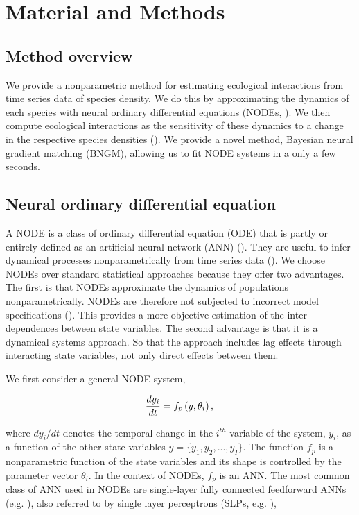 \documentclass[11pt, oneside]{article}
\begin{document}
\section{Material and Methods}

\subsection{Method overview}

We provide a nonparametric method for estimating ecological interactions from time series data of species density. 
We do this by approximating the dynamics of each species with neural ordinary differential equations (NODEs, \cite{Bonnaffe2021a}). 
We then compute ecological interactions as the sensitivity of these dynamics to a change in the respective species densities (\cite{Sugihara2012,Bonnaffe2021a}).
We provide a novel method, Bayesian neural gradient matching (BNGM), allowing us to fit NODE systems in a only a few seconds.

\subsection{Neural ordinary differential equation}

A NODE is a class of ordinary differential equation (ODE) that is partly or entirely defined as an artificial neural network (ANN) (\cite{Chen2018}).
They are useful to infer dynamical processes nonparametrically from time series data (\cite{Bonnaffe2021a}).
We choose NODEs over standard statistical approaches because they offer two advantages. 
The first is that NODEs approximate the dynamics of populations nonparametrically.
NODEs are therefore not subjected to incorrect model specifications (\cite{Jost2000,Adamson2013}).
This provides a more objective estimation of the inter-dependences between state variables. 
The second advantage is that it is a dynamical systems approach. 
So that the approach includes lag effects through interacting state variables, not only direct effects between them. 

We first consider a general NODE system,

\vspace{-0.5cm}
\begin{equation}
    \frac{dy_i}{dt} = f_p \left(y,\theta_i \right), \\
\end{equation}

where $dy_i/dt$ denotes the temporal change in the $i^{th}$ variable of the system, $y_i$, as a function of the other state variables $y = \{ y_1, y_2, ..., y_I\}$.
The function $f_p$ is a nonparametric function of the state variables and its shape is controlled by the parameter vector $\theta_i$.
In the context of NODEs, $f_p$ is an ANN.
The most common class of ANN used in NODEs are single-layer fully connected feedforward ANNs (e.g. \cite{Wu2005}), also referred to by single layer perceptrons (SLPs, e.g. \cite{Bonnaffe2021a}), 
\end{document}
